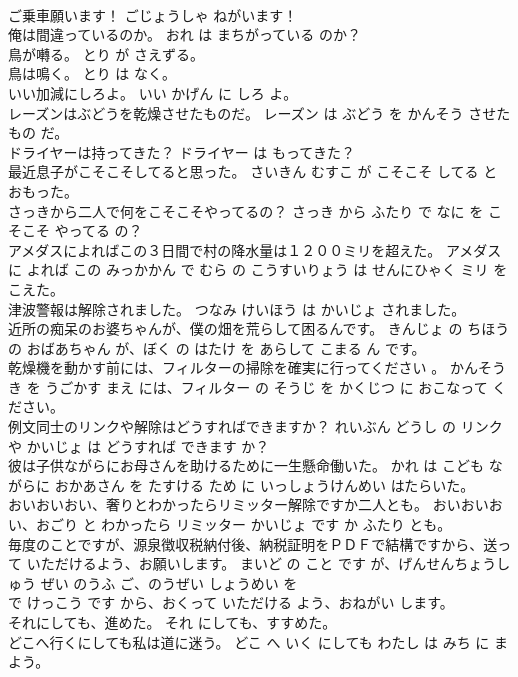 \documentclass[8pt]{extreport}
\begin{document}
\begin{CJK}{UTF8}{min}
\\	ご乗車願います！	ごじょうしゃ ねがいます！	
\\	俺は間違っているのか。	おれ は まちがっている のか？	
\\	鳥が囀る。	とり が さえずる。	
\\	鳥は鳴く。	とり は なく。	
\\	いい加減にしろよ。	いい かげん に しろ よ。	
\\	レーズンはぶどうを乾燥させたものだ。	レーズン は ぶどう を かんそう させた もの だ。	
\\	ドライヤーは持ってきた？	ドライヤー は もってきた？	
\\	最近息子がこそこそしてると思った。	さいきん むすこ が こそこそ してる と おもった。	
\\	さっきから二人で何をこそこそやってるの？	さっき から ふたり で なに を こそこそ やってる の？	
\\	アメダスによればこの３日間で村の降水量は１２００ミリを超えた。	アメダス に よれば この みっかかん で むら の こうすいりょう は せんにひゃく ミリ を こえた。	
\\	津波警報は解除されました。	つなみ けいほう は かいじょ されました。	
\\	近所の痴呆のお婆ちゃんが、僕の畑を荒らして困るんです。	きんじょ の ちほう の おばあちゃん が、ぼく の はたけ を あらして こまる ん です。	
\\	乾燥機を動かす前には、フィルターの掃除を確実に行ってください 。	かんそうき を うごかす まえ には、フィルター の そうじ を かくじつ に おこなって ください。	
\\	例文同士のリンクや解除はどうすればできますか？	れいぶん どうし の リンク や かいじょ は どうすれば できます か？	
\\	彼は子供ながらにお母さんを助けるために一生懸命働いた。	かれ は こども ながらに おかあさん を たすける ため に いっしょうけんめい はたらいた。	
\\	おいおいおい、奢りとわかったらリミッター解除ですか二人とも。	おいおいおい、おごり と わかったら リミッター かいじょ です か ふたり とも。	
\\	毎度のことですが、源泉徴収税納付後、納税証明をＰＤＦで結構ですから、送って いただけるよう、お願いします。	まいど の こと です が、げんせんちょうしゅう ぜい のうふ ご、のうぜい しょうめい を 
\\	で けっこう です から、おくって いただける よう、おねがい します。	
\\	それにしても、進めた。	それ にしても、すすめた。	
\\	どこへ行くにしても私は道に迷う。	どこ へ いく にしても わたし は みち に まよう。	

\end{CJK}
\end{document}
